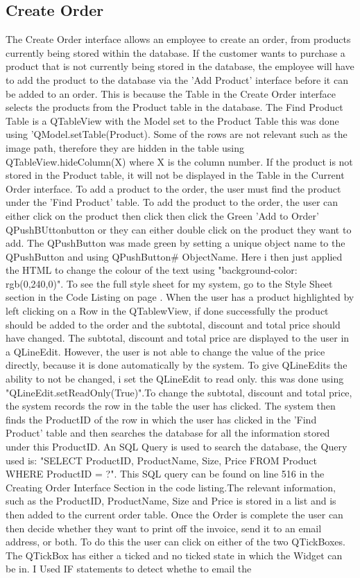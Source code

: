 \subsection{Create Order}

The Create Order interface allows an employee to create an order, from products currently being stored within the database. If the customer wants to purchase a product that is not currently being stored in the database, the employee will have to add the product to the database via the 'Add Product' interface before it can be added to an order. This is because the Table in the Create Order interface selects the products from the Product table in the database. The Find Product Table is a QTableView with the Model set to the Product Table this was done using 'QModel.setTable(Product). Some of the rows are not relevant such as the image path, therefore they are hidden in the table using QTableView.hideColumn(X) where X is the column number. If the product is not stored in the Product table, it will not be displayed in the Table in the Current Order interface. To add a product to the order, the user must find the product under the 'Find Product' table. To add the product to the order, the user can either click on the product then click then click the Green 'Add to Order' QPushBUttonbutton or they can either double click on the product they want to add. The QPushButton was made green by setting a unique object name to the QPushButton and using QPushButton\# ObjectName. Here i then just applied the HTML to change the colour of the text using "background-color: rgb(0,240,0)". To see the full style sheet for my system, go to the Style Sheet section in the Code Listing on page \pageref{fig:style}. When the user has a product highlighted by left clicking on a Row in the QTablewView, if done successfully the product should be added to the order and the subtotal, discount and total price should have changed. The subtotal, discount and total price are displayed to the user in a QLineEdit. However, the user is not able to change the value of the price directly, because it is done automatically by the system. To give QLineEdits the ability to not be changed, i set the QLineEdit to read only. this was done using "QLineEdit.setReadOnly(True)".To change the subtotal, discount and total price, the system records the row in the table the user has clicked. The system then finds the ProductID of the row in which the user has clicked in the 'Find Product' table and then searches the database for all the information stored under this ProductID. An SQL Query is used to search the database, the Query used is: "SELECT ProductID, ProductName, Size, Price FROM Product WHERE ProductID = ?". This SQL query can be found on line 516 in the Creating Order Interface Section in the code listing.The relevant information, such as the ProductID, ProductName, Size and Price is stored in a list and is then added to the current order table. Once the Order is complete the user can then decide whether they want to print off the invoice, send it to an email address, or both. To do this the user can click on either of the two QTickBoxes. The QTickBox has either a ticked and no ticked state in which the Widget can be in. I Used IF statements to detect whethe to email the 